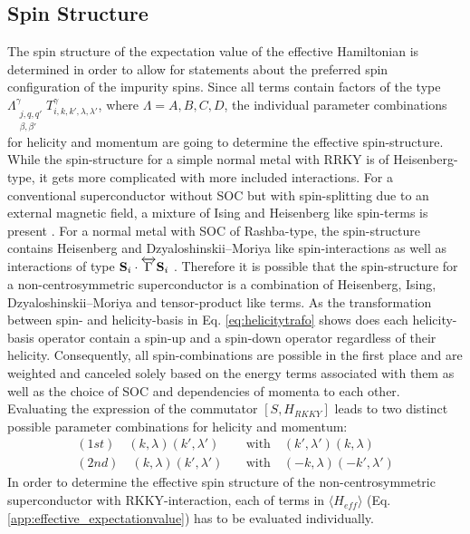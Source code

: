 \subsection{Spin Structure} \label{sec:eff_interaction_spin}
The spin structure of the expectation value of the effective Hamiltonian is determined in order to allow for statements about the preferred spin configuration of the impurity spins.
Since all terms contain factors of the type $\Lambda_{\substack{j, q,q'\\ \beta, \beta'}}^{\gamma} T ^{\gamma}_{i,k,k', \lambda, \lambda'}$, where $\Lambda = A,B,C,D$, the individual parameter combinations for helicity and momentum are going to determine the effective spin-structure. \newline
While the spin-structure for a simple normal metal with RRKY is of Heisenberg- type, it gets more complicated with more included interactions.
For a conventional superconductor without SOC but with spin-splitting due to an external magnetic field, a mixture of Ising and Heisenberg like spin-terms is present \cite{ghanbari_rkky_nodate}.
For a normal metal with SOC of Rashba-type, the spin-structure contains Heisenberg and Dzyaloshinskii–Moriya like spin-interactions as well as interactions of type $\vb{S}_i \cdot \overleftrightarrow{\Gamma} \vb{S}_i$ \cite{valizadeh_mohammad_m_magnetic_2017}.
Therefore it is possible that the spin-structure for a non-centrosymmetric superconductor is a combination of Heisenberg, Ising, Dzyaloshinskii–Moriya and tensor-product like terms. \newline
As the transformation between spin- and helicity-basis in Eq. \eqref{eq:helicitytrafo} shows does each helicity-basis operator contain a spin-up and a spin-down operator regardless of their helicity.
Consequently, all spin-combinations are possible in the first place and are weighted and canceled solely based on the energy terms associated with them as well as the choice of SOC and dependencies of momenta to each other. \newline
Evaluating the expression of the commutator $[S,H_{RKKY}]$ leads to two distinct possible parameter combinations for helicity and momentum:
\begin{align}\nonumber
    (1st) \quad (k, \lambda)( k', \lambda') \quad &\text{with} \quad (k', \lambda')(k,\lambda)\\\nonumber
    (2nd) \quad (k,\lambda)( k', \lambda')\quad &\text{with} \quad (-k,\lambda)(-k',\lambda')
\end{align}
In order to determine the effective spin structure of the non-centrosymmetric superconductor with RKKY-interaction, each of terms in $\langle H_{eff} \rangle$ (Eq. \eqref{app:effective_expectationvalue}) has to be evaluated individually.
